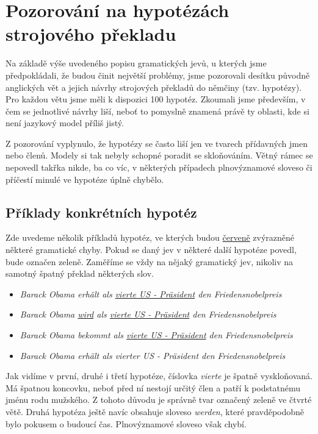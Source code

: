 \documentclass[12pt,a4paper]{report}
\begin{document}
\section{Pozorování na hypotézách strojového překladu}
Na základě výše uvedeného popisu gramatických jevů, u kterých jsme předpokládali, že budou činit největší problémy, jsme pozorovali desítku původně anglických vět a jejich návrhy strojových překladů do němčiny (tzv. hypotézy). Pro každou větu jsme měli k dispozici 100 hypotéz. Zkoumali jsme především, v čem se jednotlivé návrhy liší, neboť to pomyslně znamená právě ty oblasti, kde si není jazykový model příliš jistý.

Z pozorování vyplynulo, že hypotézy se často liší jen ve tvarech přídavných jmen nebo členů. Modely si tak nebyly schopné poradit se skloňováním. Větný rámec se nepovedl takřka nikde, ba co víc, v některých případech plnovýznamové sloveso či příčestí minulé ve hypotéze úplně chybělo.

\subsection{Příklady konkrétních hypotéz}

Zde uvedeme několik příkladů hypotéz, ve kterých budou \underline{\color{red}červeně} zvýrazněné některé gramatické chyby. Pokud se daný jev v některé další hypotéze povedl, bude označen {\color{OliveGreen}zeleně}. Zaměříme se vždy na nějaký gramatický jev, nikoliv na samotný špatný překlad některých slov.

\begin{itemize}
\item{\textit{Barack Obama erhält als \underline{\color{red}vierte US - Präsident} den Friedensnobelpreis}}
\item{\textit{Barack Obama \underline{\color{red}wird} als \underline{\color{red}vierte US - Präsident} den Friedensnobelpreis}}
\item{\textit{Barack Obama bekommt als \underline{\color{red}vierte US - Präsident} den Friedensnobelpreis}} 
\item{\textit{Barack Obama erhält als {\color{OliveGreen}vierter US - Präsident} den Friedensnobelpreis}}
\end{itemize}

Jak vidíme v první, druhé i třetí hypotéze, číslovka \textit{vierte} je špatně vyskloňovaná. Má špatnou koncovku, neboť před ní nestojí určitý člen a patří k podstatnému jménu rodu mužského. Z tohoto důvodu je správně tvar označený zeleně ve čtvrté větě. Druhá hypotéza ještě navíc obsahuje sloveso \textit{werden}, které pravděpodobně bylo pokusem o budoucí čas. Plnovýznamové sloveso však chybí.
\end{document}

